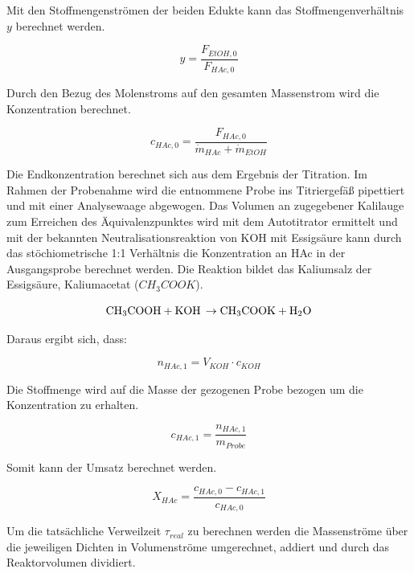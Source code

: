 \documentclass[12pt,liststotoc]{report}
\begin{document}
Mit den Stoffmengenströmen der beiden Edukte kann das Stoffmengenverhältnis $y$ berechnet werden.

\begin{equation}
    y = \frac{F_{EtOH,0}}{F_{HAc,0}}
\end{equation}

Durch den Bezug des Molenstroms auf den gesamten Massenstrom wird die Konzentration berechnet.

\begin{equation}
    c_{HAc, 0} = \frac{F_{HAc,0}}{\dot{m}_{HAc} + \dot{m}_{EtOH} }
\end{equation}


Die Endkonzentration berechnet sich aus dem Ergebnis der Titration.
Im Rahmen der Probenahme wird die entnommene Probe ins Titriergefäß pipettiert und mit einer Analysewaage abgewogen. Das Volumen an zugegebener Kalilauge zum Erreichen des Äquivalenzpunktes wird mit dem Autotitrator ermittelt und mit der bekannten Neutralisationsreaktion von KOH mit Essigsäure kann durch das stöchiometrische 1:1 Verhältnis die Konzentration an HAc in der Ausgangsprobe berechnet werden. Die Reaktion bildet das Kaliumsalz der Essigsäure, Kaliumacetat ($CH_3COOK$).

\begin{equation}
    \ce{CH_3COOH + KOH \rightarrow CH_3COOK + H2O}
\end{equation}

Daraus ergibt sich, dass:

\begin{equation}
    n_{HAc,1} = V_{KOH} \cdot c_{KOH}
\end{equation}

Die Stoffmenge wird auf die Masse der gezogenen Probe bezogen um die Konzentration zu erhalten.

\begin{equation}
c_{HAc,1} = \frac{n_{HAc,1}}{m_{Probe}}
\end{equation}

Somit kann der Umsatz berechnet werden.

\begin{equation}
    X_{HAc} = \frac{c_{HAc,0} - c_{HAc,1}}{c_{HAc,0}}
\end{equation}

Um die tatsächliche Verweilzeit $\tau_{real}$ zu berechnen werden die Massenströme über die jeweiligen Dichten in Volumenströme umgerechnet, addiert und durch das Reaktorvolumen dividiert.
\end{document}
